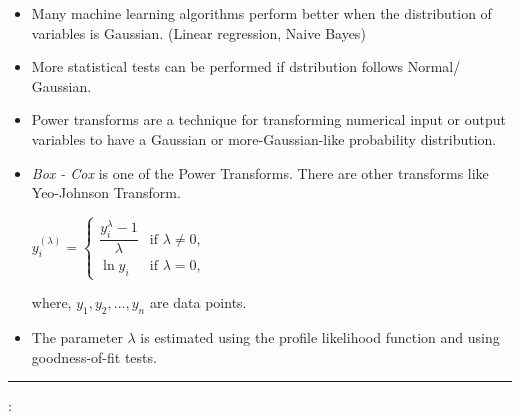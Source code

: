 \documentclass[	DIV=calc,%
paper=a4,%
fontsize=11pt,%
twocolumn]{scrartcl} %
\newcommand{\hformbar}[1]{\vspace{5pt}\hrule\vspace{10pt}} %
\newcommand{\formdesc}[1]{\noindent\textbf{#1}}
\begin{document}
\begin{itemize}
	\item Many machine learning algorithms perform better when the distribution of variables is Gaussian. (Linear regression, Naive Bayes)
	\item More statistical tests can be performed if dstribution follows Normal/ Gaussian.
	\item Power transforms are a technique for transforming numerical input or output variables to have a Gaussian or more-Gaussian-like probability distribution.
	\item \emph{Box - Cox} is one of the Power Transforms. There are other transforms like Yeo-Johnson Transform.
	
	\begin{math}
		{\displaystyle y_{i}^{(\lambda )}={\begin{cases}{\dfrac {y_{i}^{\lambda }-1}{\lambda }}&{\text{if }}\lambda \neq 0,\\\ln y_{i}&{\text{if }}\lambda =0,\end{cases}}}
	\end{math}

where,
$y_1, y_2,..., y_n$ are data points.

	\item The parameter $\lambda$ is estimated using the profile likelihood function and using goodness-of-fit tests.
 
\end{itemize}


\hformbar

\formdesc{Co-Variance}:
\end{document}
